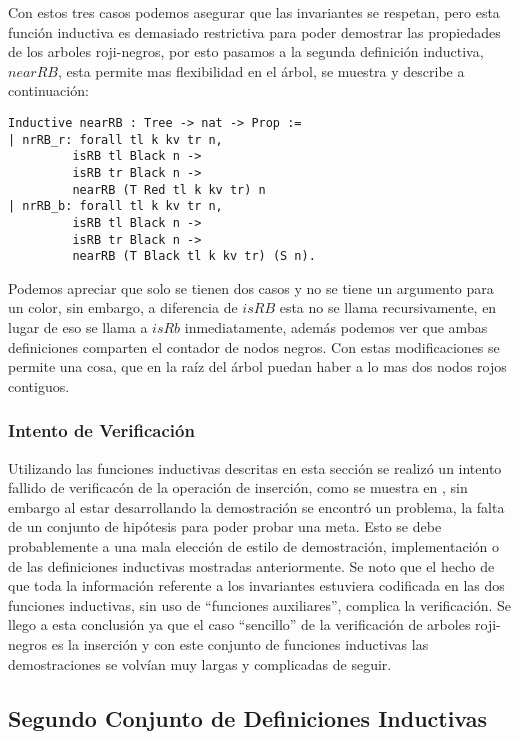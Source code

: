\documentclass[letterpaper,12pt,oneside]{book}
\newcommand{\arns}{arboles roji-negros}
\theoremstyle{plain}
\theoremstyle{definition}
\theoremstyle{remark}
\begin{document}
Con estos tres casos podemos asegurar que las invariantes se respetan, pero esta funci\'on inductiva es 
demasiado restrictiva para poder demostrar las propiedades de los {\arns}, por esto pasamos a la segunda 
definici\'on inductiva, $nearRB$,  esta permite mas flexibilidad en el \'arbol, se muestra y describe a 
continuaci\'on:

\begin{verbatim}
Inductive nearRB : Tree -> nat -> Prop :=
| nrRB_r: forall tl k kv tr n,
         isRB tl Black n ->
         isRB tr Black n ->
         nearRB (T Red tl k kv tr) n
| nrRB_b: forall tl k kv tr n,
         isRB tl Black n ->
         isRB tr Black n ->
         nearRB (T Black tl k kv tr) (S n).
\end{verbatim}
Podemos apreciar que solo se tienen dos casos y no se tiene un argumento para un color, sin embargo, a 
diferencia de $isRB$ esta no se llama recursivamente, en lugar de eso se llama a $isRb$ inmediatamente, 
además podemos ver que ambas definiciones comparten el contador de nodos negros.
Con estas modificaciones se permite una cosa, que en la ra\'iz del \'arbol puedan haber a lo mas dos 
nodos rojos contiguos.

\subsubsection{Intento de Verificaci\'on}
Utilizando las funciones inductivas descritas en esta secci\'on se realiz\'o un intento fallido de 
verificac\'on de la operaci\'on de inserci\'on, como se muestra en \cite{appel}, sin embargo al estar 
desarrollando la demostraci\'on se encontró un problema, la falta de un conjunto de hipótesis para poder 
probar una meta. Esto se debe probablemente a una mala elección de estilo de demostraci\'on, 
implementaci\'on o de las definiciones inductivas mostradas anteriormente. Se noto que el hecho de que 
toda la informaci\'on referente a los invariantes estuviera codificada en las dos funciones inductivas, 
sin uso de ``funciones auxiliares'', complica la verificaci\'on. Se llego a esta conclusi\'on ya que el 
caso ``sencillo'' de la verificaci\'on de {\arns} es la inserci\'on y con este conjunto de funciones 
inductivas las demostraciones se volvían muy largas y complicadas de seguir.

\subsection{Segundo Conjunto de Definiciones Inductivas}
\end{document}
